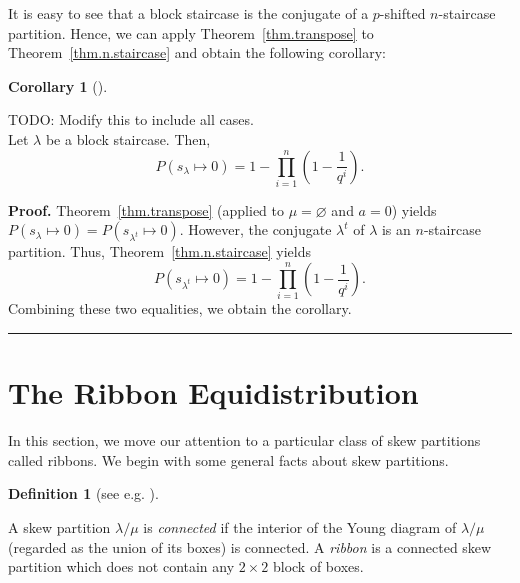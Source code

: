 \documentclass[numbers=enddot,12pt,final,onecolumn,notitlepage]{scrartcl}%
\theoremstyle{definition}
\newtheorem{defi}[theo]{Definition}
\newenvironment{definition}[1][]
{\begin{defi}[#1]\begin{leftbar}}
{\end{leftbar}\end{defi}}
\newtheorem{coro}[theo]{Corollary}
\newenvironment{corollary}[1][]
{\begin{coro}[#1]\begin{leftbar}}
{\end{leftbar}\end{coro}}
\newtheorem{exam}[theo]{Example}
\newenvironment{example}[1][]
{\begin{exam}[#1]\begin{leftbar}}
{\end{leftbar}\end{exam}}
\newenvironment{proof}[1][Proof]{\noindent\textbf{#1.} }{\ \rule{0.5em}{0.5em}}
\let\prodnonlimits\prod
\renewcommand{\prod}{\prodnonlimits\limits}
\theoremstyle{plainsl}
\begin{document}
It is easy to see that a block staircase is the conjugate of a $p$-shifted $n$-staircase partition.
Hence, we can apply Theorem~\ref{thm.transpose} to Theorem~\ref{thm.n.staircase}
and obtain the following corollary:

\begin{corollary}
TODO: Modify this to include all cases.\\

Let $\lambda$ be a block staircase. Then,
\[
P(s_{\lambda} \longmapsto 0) = 1-\prod_{i=1}^{n} \left(  1-\dfrac{1}{q^{i}}\right) .
\]
\end{corollary}

\begin{proof}
Theorem~\ref{thm.transpose} (applied to $\mu = \varnothing$
and $a = 0$) yields
$P\left(  s_{\lambda}\mapsto 0\right)
=P\left(  s_{\lambda^{t}}\mapsto 0\right)$.
However, the conjugate $\lambda^t$ of $\lambda$ is an $n$-staircase partition.
Thus, Theorem~\ref{thm.n.staircase}
yields
\[
P(s_{\lambda^t} \longmapsto 0) = 1-\prod_{i=1}^{n} \left(  1-\dfrac{1}{q^{i}}\right) .
\]
Combining these two equalities, we obtain the corollary.
\end{proof}

\section{The Ribbon Equidistribution}

In this section, we move our attention to a particular class of skew partitions called ribbons. We begin with some general facts about skew partitions.

\begin{definition}[see e.g. {\cite[\S7.17]{EC2}}]

A skew partition $\lambda/\mu$ is \emph{connected} if the interior of the Young diagram of $\lambda/\mu$ (regarded as the union of its boxes) is connected.
A \emph{ribbon} is a connected skew partition which does not contain any $2 \times 2$ block of boxes. 

\end{definition}


\end{document}
